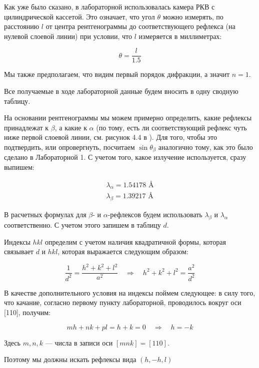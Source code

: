 \documentclass[a4paper, 12pt]{article}
\newcommand{\qrq}
{\ensuremath{\quad \Rightarrow \quad}} %
\begin{document}
Как уже было сказано, в лабораторной использовалась камера РКВ с цилиндрической кассетой. Это означает, что угол $\theta$ можно измерять, по расстоянию $l$ от центра рентгенограммы до соответствующего рефлекса (на нулевой слоевой линии) при условии, что $l$ измеряется в миллиметрах: 

\begin{equation}
	\theta = \frac{l}{1.5}
\end{equation}

Мы также предполагаем, что видим первый порядок дифракции, а значит $n = 1$.

Все получаемые в ходе лабораторной данные будем вносить в одну сводную таблицу.

На основании рентгенограммы мы можем примерно определить, какие рефлексы принадлежат к $\beta$, а какие к $\alpha$ (по тому, есть ли соответствующий рефлекс чуть ниже первой слоевой линии, см. рисунок 4.4 в \cite{Practicum}). Для того, чтобы это подтвердить, или опровергнуть, посчитаем $\sin\theta_\beta$ аналогично тому, как это было сделано в Лабораторной 1. С учетом того, какое излучение используется, сразу выпишем:

\begin{align}
	\lambda_\alpha = 1.54178 \text{ \AA} \\
	\lambda_\beta = 1.39217 \text{ \AA}
\end{align}

В расчетных формулах для $\beta$- и $\alpha$-рефлексов будем использовать $\lambda_\beta$ и $\lambda_\alpha$ соответственно. С учетом этого запишем в таблицу $d$.

Индексы $hkl$ определим с учетом наличия квадратичной формы, которая связывает $d$ и $hkl$, которая выражается следующим образом:

\begin{equation}
	\frac{1}{d^2} = \frac{h^2 + k^2 + l^2}{a^2} \qrq h^2 + k^2 + l^2 = \frac{a^2}{d^2}
\end{equation}

В качестве дополнительного условия на индексы поймем следующее: в силу того, что качание, согласно первому пункту лабораторной, проводилось вокруг оси [110], получим:

\begin{equation}
	mh + nk + pl = h + k = 0 \qrq h = -k
\end{equation} 

Здесь $m, n, k$ --- числа в записи оси $[mnk] = [110]$.

Поэтому мы должны искать рефлексы вида $(h, -h, l)$
\end{document}
